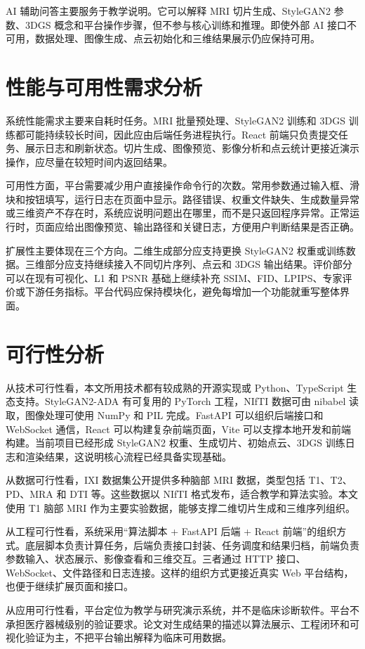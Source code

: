 AI 辅助问答主要服务于教学说明。它可以解释 MRI 切片生成、StyleGAN2 参数、3DGS 概念和平台操作步骤，但不参与核心训练和推理。即使外部 AI 接口不可用，数据处理、图像生成、点云初始化和三维结果展示仍应保持可用。

\section{性能与可用性需求分析}
系统性能需求主要来自耗时任务。MRI 批量预处理、StyleGAN2 训练和 3DGS 训练都可能持续较长时间，因此应由后端任务进程执行。React 前端只负责提交任务、展示日志和刷新状态。切片生成、图像预览、影像分析和点云统计更接近演示操作，应尽量在较短时间内返回结果。

可用性方面，平台需要减少用户直接操作命令行的次数。常用参数通过输入框、滑块和按钮填写，运行日志在页面中显示。路径错误、权重文件缺失、生成数量异常或三维资产不存在时，系统应说明问题出在哪里，而不是只返回程序异常。正常运行时，页面应给出图像预览、输出路径和关键日志，方便用户判断结果是否正确。

扩展性主要体现在三个方向。二维生成部分应支持更换 StyleGAN2 权重或训练数据。三维部分应支持继续接入不同切片序列、点云和 3DGS 输出结果。评价部分可以在现有可视化、L1 和 PSNR 基础上继续补充 SSIM、FID、LPIPS、专家评价或下游任务指标。平台代码应保持模块化，避免每增加一个功能就重写整体界面。

\section{可行性分析}
从技术可行性看，本文所用技术都有较成熟的开源实现或 Python、TypeScript 生态支持。StyleGAN2-ADA 有可复用的 PyTorch 工程，NIfTI 数据可由 nibabel 读取，图像处理可使用 NumPy 和 PIL 完成。FastAPI 可以组织后端接口和 WebSocket 通信，React 可以构建复杂前端页面，Vite 可以支撑本地开发和前端构建。当前项目已经形成 StyleGAN2 权重、生成切片、初始点云、3DGS 训练日志和渲染结果，这说明核心流程已经具备实现基础。

从数据可行性看，IXI 数据集公开提供多种脑部 MRI 数据，类型包括 T1、T2、PD、MRA 和 DTI 等。这些数据以 NIfTI 格式发布，适合教学和算法实验\cite{ixiDataset}。本文使用 T1 脑部 MRI 作为主要实验数据，能够支撑二维切片生成和三维序列组织。

从工程可行性看，系统采用“算法脚本 + FastAPI 后端 + React 前端”的组织方式。底层脚本负责计算任务，后端负责接口封装、任务调度和结果归档，前端负责参数输入、状态展示、影像查看和三维交互。三者通过 HTTP 接口、WebSocket、文件路径和日志连接。这样的组织方式更接近真实 Web 平台结构，也便于继续扩展页面和接口。

从应用可行性看，平台定位为教学与研究演示系统，并不是临床诊断软件。平台不承担医疗器械级别的验证要求。论文对生成结果的描述以算法展示、工程闭环和可视化验证为主，不把平台输出解释为临床可用数据。
